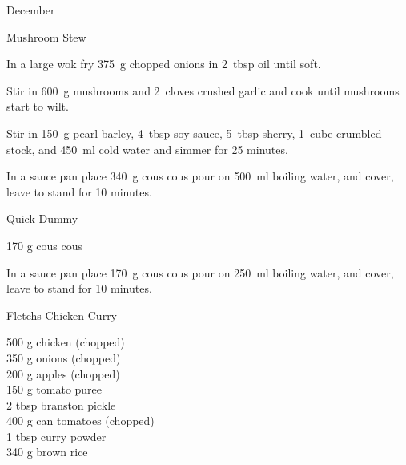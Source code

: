\begin{menu}{December}
\begin{recipe}{2}{Mushroom Stew}
    \begin{instructions}
    \item 
        In a large wok fry
        375~g chopped onions
        in
        2~tbsp  oil
        until soft.
      \item 
        Stir in
        600~g  mushrooms
        and
        2~cloves crushed garlic
        and cook until mushrooms start to wilt.
      \item 
        Stir in
        150~g  pearl barley,
        4~tbsp  soy sauce,
        5~tbsp  sherry,
        1~cube crumbled stock,
        and
        450~ml  cold water
        and simmer for 25 minutes.
      \item 
    In a
    sauce pan 
    place
    340~g  cous cous
    pour on
    500~ml  boiling water,
    and cover, leave to stand for 10 minutes.
  
    \end{instructions}
    \end{recipe}%
  
    \begin{recipe}{1}{Quick Dummy}%
		\begin{ingredients}
		170 g cous cous  \\
	
		\end{ingredients}
	
	
    \begin{instructions}
    \item 
    In a
    sauce pan 
    place
    170~g  cous cous
    pour on
    250~ml  boiling water,
    and cover, leave to stand for 10 minutes.
  
    \end{instructions}
    \end{recipe}%
  
    \begin{recipe}{2}{Fletchs Chicken Curry}%
		\begin{ingredients}
		500 g chicken (chopped) \\
	350 g onions (chopped) \\
	200 g apples (chopped) \\
	150 g tomato puree  \\
	2 tbsp branston pickle  \\
	400 g can tomatoes (chopped) \\
	1 tbsp curry powder  \\
	340 g brown rice  \\
	

\end{ingredients}
\end{recipe}
\end{menu}
